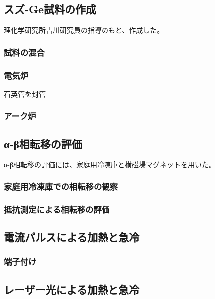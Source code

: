 \subsection{スズ-Ge試料の作成}
理化学研究所吉川研究員の指導のもと、作成した。%

\subsubsection{試料の混合}

\subsubsection{電気炉}
石英管を封管

\subsubsection{アーク炉}

\subsection{α-β相転移の評価}
α-β相転移の評価には、家庭用冷凍庫と横磁場マグネットを用いた。

\subsubsection{家庭用冷凍庫での相転移の観察}

\subsubsection{抵抗測定による相転移の評価}

\subsection{電流パルスによる加熱と急冷}

\subsubsection{端子付け}

\subsection{レーザー光による加熱と急冷}
